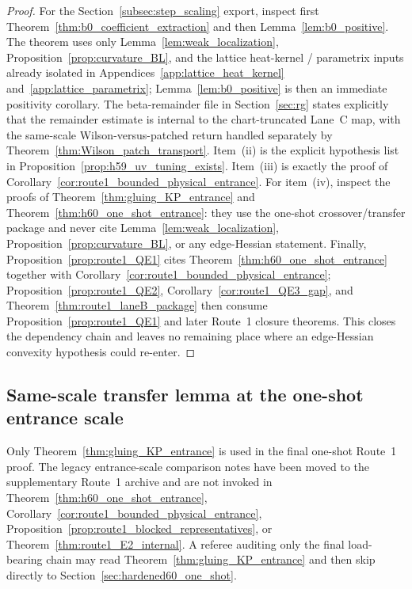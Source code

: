 \begin{proof}
For the Section~\ref{subsec:step_scaling} export, inspect first Theorem~\ref{thm:b0_coefficient_extraction} and then Lemma~\ref{lem:b0_positive}.
The theorem uses only Lemma~\ref{lem:weak_localization}, Proposition~\ref{prop:curvature_BL}, and the lattice heat-kernel / parametrix inputs already isolated in Appendices~\ref{app:lattice_heat_kernel} and~\ref{app:lattice_parametrix}; Lemma~\ref{lem:b0_positive} is then an immediate positivity corollary.
The beta-remainder file in Section~\ref{sec:rg} states explicitly that the remainder estimate is internal to the chart-truncated Lane~C map,
with the same-scale Wilson-versus-patched return handled separately by Theorem~\ref{thm:Wilson_patch_transport}.
Item~(ii) is the explicit hypothesis list in Proposition~\ref{prop:h59_uv_tuning_exists}.
Item~(iii) is exactly the proof of Corollary~\ref{cor:route1_bounded_physical_entrance}.
For item~(iv), inspect the proofs of Theorem~\ref{thm:gluing_KP_entrance} and Theorem~\ref{thm:h60_one_shot_entrance}: they use the one-shot crossover/transfer package and never cite Lemma~\ref{lem:weak_localization}, Proposition~\ref{prop:curvature_BL}, or any edge-Hessian statement.
Finally, Proposition~\ref{prop:route1_QE1} cites Theorem~\ref{thm:h60_one_shot_entrance} together with Corollary~\ref{cor:route1_bounded_physical_entrance};
Proposition~\ref{prop:route1_QE2}, Corollary~\ref{cor:route1_QE3_gap}, and Theorem~\ref{thm:route1_laneB_package} then consume Proposition~\ref{prop:route1_QE1} and later Route~1 closure theorems.
This closes the dependency chain and leaves no remaining place where an edge-Hessian convexity hypothesis could re-enter.
\end{proof}

\subsection{Same-scale transfer lemma at the one-shot entrance scale}
\label{sec:global_gluing}

\begin{remark}\label{rem:gluing_scope}
Only Theorem~\ref{thm:gluing_KP_entrance} is used in the final one-shot Route~1 proof.
The legacy entrance-scale comparison notes have been moved to the supplementary Route~1 archive and are not invoked in Theorem~\ref{thm:h60_one_shot_entrance}, Corollary~\ref{cor:route1_bounded_physical_entrance}, Proposition~\ref{prop:route1_blocked_representatives}, or Theorem~\ref{thm:route1_E2_internal}.
A referee auditing only the final load-bearing chain may read Theorem~\ref{thm:gluing_KP_entrance} and then skip directly to Section~\ref{sec:hardened60_one_shot}.
\end{remark}

